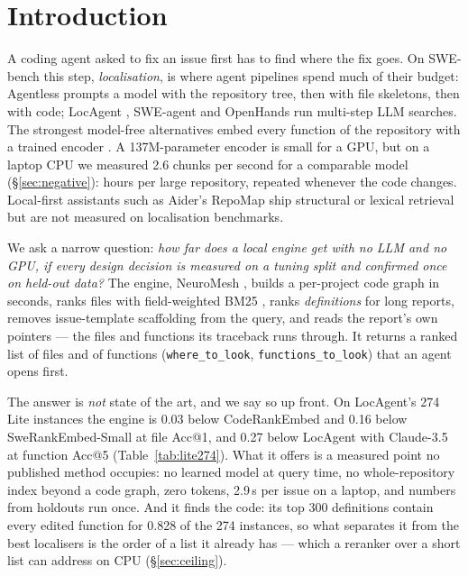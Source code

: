 \documentclass[10pt,twocolumn]{article}
\makeatletter
\newcommand{\nm}{NeuroMesh}
\newcommand{\accat}[1]{Acc@#1}
\makeatother
\begin{document}
\section{Introduction}
\label{sec:intro}

A coding agent asked to fix an issue first has to find where the fix goes. On SWE-bench
\citep{jimenez2024swebench} this step, \emph{localisation}, is where agent pipelines spend much of
their budget: Agentless \citep{xia2025agentless} prompts a model with the repository tree, then with
file skeletons, then with code; LocAgent \citep{chen2025locagent}, SWE-agent \citep{yang2024sweagent}
and OpenHands \citep{wang2025openhands} run multi-step LLM searches. The strongest model-free
alternatives embed every function of the repository with a trained encoder
\citep{suresh2025cornstack,reddy2026swerank}. A 137M-parameter encoder is small for a GPU, but on a
laptop CPU we measured 2.6 chunks per second for a comparable model (\S\ref{sec:negative}): hours per
large repository, repeated whenever the code changes. Local-first assistants such as Aider's RepoMap
\citep{aider_repomap} ship structural or lexical retrieval but are not measured on localisation
benchmarks.

We ask a narrow question: \emph{how far does a local engine get with no LLM and no GPU, if every
design decision is measured on a tuning split and confirmed once on held-out data?} The engine,
\nm{} \citep{neuromesh}, builds a per-project code graph in seconds, ranks files with field-weighted
BM25 \citep{robertson2004bm25f}, ranks \emph{definitions} for long reports, removes issue-template
scaffolding from the query, and reads the report's own pointers --- the files and functions its
traceback runs through. It returns a ranked list of files and of functions (\texttt{where\_to\_look},
\texttt{functions\_to\_look}) that an agent opens first.

The answer is \emph{not} state of the art, and we say so up front. On LocAgent's 274 Lite instances
the engine is 0.03 below CodeRankEmbed and 0.16 below SweRankEmbed-Small at file \accat{1}, and
0.27 below LocAgent with Claude-3.5 at function \accat{5} (Table~\ref{tab:lite274}). What it offers
is a measured point no published method occupies: no learned model at query time, no
whole-repository index beyond a code graph, zero tokens, 2.9\,s per issue on a laptop, and numbers
from holdouts run once. And it finds the code: its top 300 definitions contain every edited
function for 0.828 of the 274 instances, so what separates it from the best localisers is the order
of a list it already has --- which a reranker over a short list can address on CPU
(\S\ref{sec:ceiling}).
\end{document}
